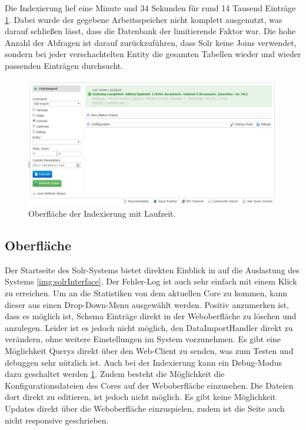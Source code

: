 Die Indexierung lief eine Minute und 34 Sekunden für rund 14 Tausend Einträge \ref{img:solrIndexTime}. Dabei wurde der gegebene Arbeitsspeicher nicht komplett ausgenutzt, was darauf schließen lässt, dass die Datenbank der limitierende Faktor war. Die hohe Anzahl der Abfragen ist darauf zurückzuführen, dass Solr keine Joins verwendet, sondern bei jeder verschachtelten Entity die gesamten Tabellen wieder und wieder passenden Einträgen durchsucht.

\begin{figure}
	\centering
	\includegraphics[width=1\linewidth]{images/solr_indexing_time.png}
	\caption{Oberfläche der Indexierung mit Laufzeit.}
	\label{img:solrIndexTime}
\end{figure}

\subsection{Oberfläche}

Der Startseite des Solr-Systems bietet direkten Einblick in auf die Auslastung des Systems \ref{img:solrInterface}. Der Fehler-Log ist auch sehr einfach mit einem Klick zu erreichen. Um an die Statistiken von dem aktuellen Core zu kommen, kann dieser aus einen Drop-Down-Menu ausgewählt werden. Positiv anzumerken ist, dass es möglich ist, Schema Einträge direkt in der Weboberfläche zu löschen und anzulegen. Leider ist es jedoch nicht möglich, den DataImportHandler direkt zu verändern, ohne weitere Einstellungen im System vorzunehmen. Es gibt eine Möglichkeit Querys direkt über den Web-Client zu senden, was zum Testen und debuggen sehr nützlich ist. Auch bei der Indexierung kann ein Debug-Modus dazu geschaltet werden \ref{img:solrIndexTime}. Zudem besteht die Möglichkeit die Konfigurationsdateien des Cores auf der Weboberfläche einzusehen. Die Dateien dort direkt zu editieren, ist jedoch nicht möglich.
Es gibt keine Möglichkeit Updates direkt über die Weboberfläche einzuspielen, zudem ist die Seite auch nicht responsive geschrieben. 

